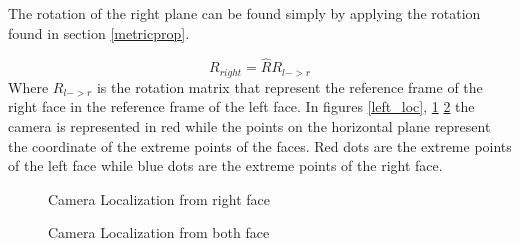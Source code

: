 \documentclass[11pt, oneside]{article}   	%
\begin{document}
The rotation of the right plane can be found simply by applying the rotation found in section \ref{metricprop}.


$$
R_{right} = \hat{R}R_{l->r}
$$
Where $R_{l->r}$ is the rotation matrix that represent the reference frame of the right face in the reference frame of the left face.
In figures \ref{left_loc}, \ref{right_loc} \ref{general_loc} the camera is represented in red while the points on the horizontal plane represent the coordinate of the extreme points of the faces. Red dots are the extreme points of the left face while blue dots are the extreme points of the right face. 

\begin{figure}
 \centering
    \qquad
    \caption{Camera Localization from right face}%
    \label{right_loc}%
\end{figure}

\begin{figure}
 \centering
    \qquad
    \caption{Camera Localization from both face}%
    \label{general_loc}%
\end{figure}
\end{document}

